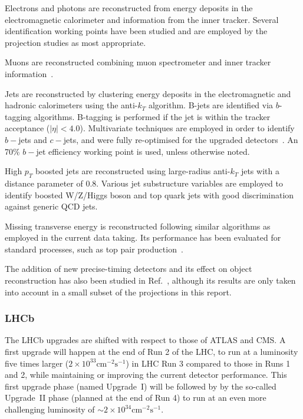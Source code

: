 Electrons and photons are reconstructed from energy deposits in the electromagnetic calorimeter and information from the inner tracker\cite{ATLAS_LAr_TDR,CMS_Barrel_TDR,Collaboration:2293646,CMS_MTD_TP}.
Several identification working points have been studied and are employed by the projection studies as most appropriate.

Muons are reconstructed combining muon spectrometer and inner tracker information~\cite{ATLAS_Muon_TDR,CMS_Muon_TDR}.

Jets are reconstructed by clustering energy deposits in the electromagnetic and hadronic calorimeters\cite{ATLAS_Tile_TDR,ATLAS_LAr_TDR,CMS_Barrel_TDR} using the anti-$k_{T}$ algorithm\cite{Cacciari:2008gp}.
B-jets are identified via $b$-tagging algorithms. B-tagging is performed if the jet is within the tracker acceptance ($|\eta|<4.0$).
Multivariate techniques are employed in order to identify $b-$jets and $c-$jets, and were fully re-optimised for the upgraded detectors~\cite{ATLAS_Pixel_TDR,CMS_Tracker_TDR}.
An 70\% $b-$jet efficiency working point is used, unless otherwise noted.

High $p_T$ boosted jets are reconstructed using large-radius anti-$k_{T}$ jets with a distance parameter of 0.8. Various jet substructure variables are employed to identify boosted W/Z/Higgs boson and top quark jets with good discrimination against generic QCD jets. 

Missing transverse energy is reconstructed following similar algorithms as employed in the current data taking.
Its performance has been evaluated for standard processes, such as top pair production~\cite{ATLAS_Pixel_TDR,Contardo:2020886}.

The addition of new precise-timing detectors and its effect on object reconstruction has also been studied in Ref.~\cite{ATLAS_TP_HGTD,CMS_MTD_TP}, although its results are only taken into account in a small subset of the projections in this report.

\subsubsection{LHCb}
\label{sec:methods:perf_LHCb}
The LHCb upgrades are shifted with respect to those of ATLAS and CMS. A first upgrade will happen at the end of Run 2 of the LHC, to run at a luminosity five times larger  ($2\times 10^{33}\text{cm}^{-2}\text{s}^{-1}$) in LHC Run 3 compared to those in Runs 1 and 2, while maintaining or improving the current detector performance. This first upgrade phase (named \mbox{Upgrade~I}) will be followed by by the so-called \mbox{Upgrade~II} phase (planned at the end of Run 4) to run at an even more challenging luminosity of $\sim 2\times 10^{34}\text{cm}^{-2}\text{s}^{-1}$.

